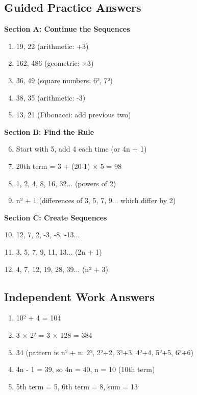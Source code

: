 \documentclass{article}
\begin{document}
\subsection*{Guided Practice Answers}

\textbf{Section A: Continue the Sequences}
\begin{enumerate}
    \item 19, 22 (arithmetic: +3)
    \item 162, 486 (geometric: ×3)
    \item 36, 49 (square numbers: 6², 7²)
    \item 38, 35 (arithmetic: -3)
    \item 13, 21 (Fibonacci: add previous two)
\end{enumerate}

\textbf{Section B: Find the Rule}  
\begin{enumerate}
    \setcounter{enumi}{5}
    \item Start with 5, add 4 each time (or 4n + 1)
    \item 20th term = 3 + (20-1) × 5 = 98
    \item 1, 2, 4, 8, 16, 32... (powers of 2)
    \item n² + 1 (differences of 3, 5, 7, 9... which differ by 2)
\end{enumerate}

\textbf{Section C: Create Sequences}
\begin{enumerate}
    \setcounter{enumi}{9}
    \item 12, 7, 2, -3, -8, -13...
    \item 3, 5, 7, 9, 11, 13... (2n + 1)
    \item 4, 7, 12, 19, 28, 39... (n² + 3)
\end{enumerate}

\subsection*{Independent Work Answers}
\begin{enumerate}
    \item 10² + 4 = 104
    \item 3 × 2⁷ = 3 × 128 = 384  
    \item 34 (pattern is n² + n: 2², 2²+2, 3²+3, 4²+4, 5²+5, 6²+6)
    \item 4n - 1 = 39, so 4n = 40, n = 10 (10th term)
    \item 5th term = 5, 6th term = 8, sum = 13
\end{enumerate}
\end{document}
